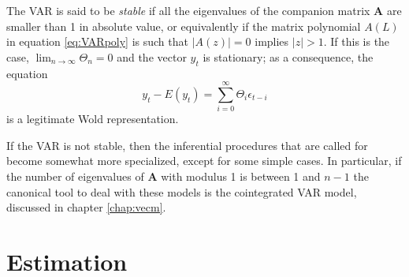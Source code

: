 The VAR is said to be \emph{stable} if all the eigenvalues of the
companion matrix $\mathbf{A}$ are smaller than 1 in absolute value, or
equivalently if the matrix polynomial $A(L)$ in equation
\eqref{eq:VARpoly} is such that $|A(z)| = 0$ implies $|z|>1$. If this
is the case, $\lim_{n \to \infty} \Theta_n = 0$ and the vector $y_t$ is
stationary; as a consequence, the equation
\begin{equation}
  \label{eq:VMArep}
  y_t - E(y_t) = \sum_{i=0}^{\infty} \Theta_i \epsilon_{t-i}
\end{equation}
is a legitimate Wold representation. 

If the VAR is not stable, then the inferential procedures that are
called for become somewhat more specialized, except for some simple
cases. In particular, if the number of eigenvalues of $\mathbf{A}$
with modulus 1 is between 1 and $n-1$ the canonical tool to deal with
these models is the cointegrated VAR model, discussed in chapter
\ref{chap:vecm}.

\section{Estimation}
\label{sec:var-estim}

